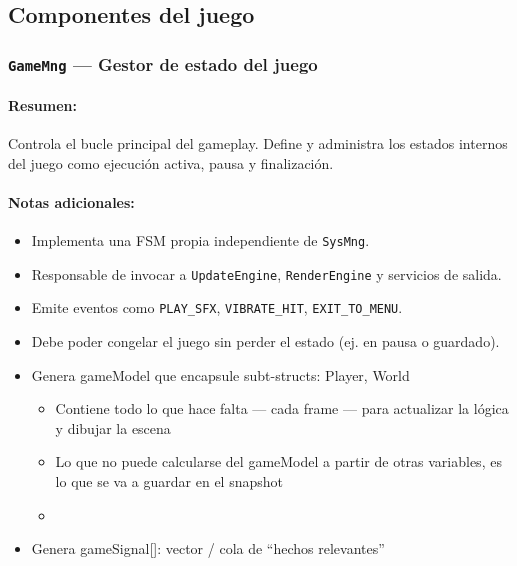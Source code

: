 \documentclass[11pt,a4paper]{article}
\begin{document}
\subsection{Componentes del juego}

\subsubsection{\texttt{GameMng} — Gestor de estado del juego}
\paragraph{Resumen:} Controla el bucle principal del gameplay. Define y administra los estados internos del juego como ejecución activa, pausa y finalización.
\paragraph{Notas adicionales:}
\begin{itemize}
  \item Implementa una FSM propia independiente de \texttt{SysMng}.
  \item Responsable de invocar a \texttt{UpdateEngine}, \texttt{RenderEngine} y servicios de salida.
  \item Emite eventos como \texttt{PLAY\_SFX}, \texttt{VIBRATE\_HIT}, \texttt{EXIT\_TO\_MENU}.
  \item Debe poder congelar el juego sin perder el estado (ej. en pausa o guardado).
  \item Genera gameModel que encapsule subt-structs: Player, World 
  \begin{itemize}
    \item Contiene todo lo que hace falta — cada frame — para actualizar la lógica y dibujar la escena
    \item Lo que no puede calcularse del gameModel a partir de otras variables, es lo que se va a guardar en el snapshot
    \item 
  \end{itemize}
  \item Genera gameSignal[]: vector / cola de “hechos relevantes”
\end{itemize}
\end{document}
